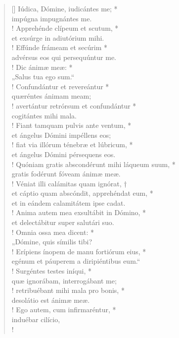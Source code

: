 \begin{verse}[\versewidth]
Iúdica, Dómine, iudicántes me; *\\
impúgna impugnántes me.\\!
\vin Apprehénde clípeum et scutum, *\\
\vin et exsúrge in adiutórium mihi.\\!
Effúnde frámeam et secúrim *\\
advérsus eos qui persequúntur me.\\!
\vin Dic ánimæ meæ: *\\
\vin „Salus tua ego sum.“\\!
Confundántur et revereántur *\\
quæréntes ánimam meam;\\!
\vin avertántur retrórsum et confundántur *\\
\vin cogitántes mihi mala.\\!
Fiant tamquam pulvis ante ventum, *\\
et ángelus Dómini impéllens eos;\\!
\vin fiat via illórum ténebræ et lúbricum, *\\
\vin et ángelus Dómini pérsequens eos.\\!
Quóniam gratis abscondérunt mihi láqueum suum, *\\
gratis fodérunt fóveam ánimæ meæ.\\!
\vin Véniat illi calámitas quam ignórat, †\\
\vin et cáptio quam abscóndit, apprehéndat eum, *\\
\vin et in eándem calamitátem ipse cadat.\\!
Anima autem mea exsultábit in Dómino, *\\
et delectábitur super salutári suo.\\!
\vin Omnia ossa mea dicent: *\\
\vin „Dómine, quis símilis tibi?\\!
Erípiens ínopem de manu fortiórum eius, *\\
egénum et páuperem a diripiéntibus eum.“\\!
\vin Surgéntes testes iníqui, *\\
\vin quæ ignorábam, interrogábant me;\\!
retribuébant mihi mala pro bonis, *\\
desolátio est ánimæ meæ.\\!
\vin Ego autem, cum infirmaréntur, *\\
\vin induébar cilício,\\!

\end{verse}
